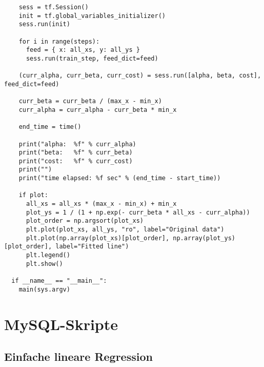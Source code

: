 \begin{verbatim}
    sess = tf.Session()
    init = tf.global_variables_initializer()
    sess.run(init)

    for i in range(steps):
      feed = { x: all_xs, y: all_ys }
      sess.run(train_step, feed_dict=feed)

    (curr_alpha, curr_beta, curr_cost) = sess.run([alpha, beta, cost], feed_dict=feed)

    curr_beta = curr_beta / (max_x - min_x)
    curr_alpha = curr_alpha - curr_beta * min_x

    end_time = time()

    print("alpha:  %f" % curr_alpha)
    print("beta:   %f" % curr_beta)
    print("cost:   %f" % curr_cost)
    print("")
    print("time elapsed: %f sec" % (end_time - start_time))

    if plot:
      all_xs = all_xs * (max_x - min_x) + min_x
      plot_ys = 1 / (1 + np.exp(- curr_beta * all_xs - curr_alpha))
      plot_order = np.argsort(plot_xs)
      plt.plot(plot_xs, all_ys, "ro", label="Original data")
      plt.plot(np.array(plot_xs)[plot_order], np.array(plot_ys)[plot_order], label="Fitted line")
      plt.legend()
      plt.show()

  if __name__ == "__main__":
    main(sys.argv)
\end{verbatim}

\chapter{MySQL-Skripte}
\label{appendix:D}

\section{Einfache lineare Regression}
\label{appendix:D:1}

